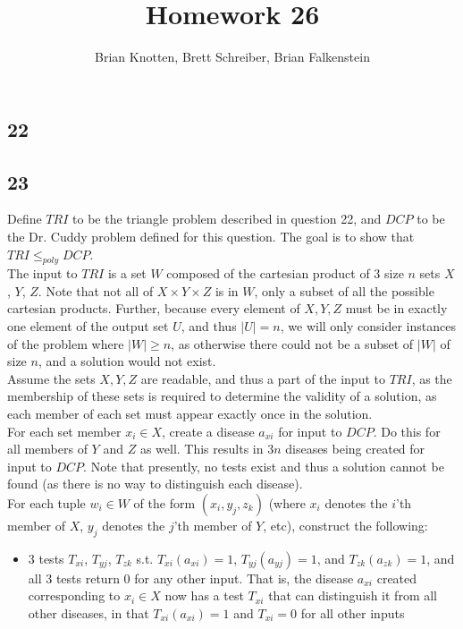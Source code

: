 \documentclass[letterpaper,notitlepage,twoside]{article}
\begin{document}
\title{Homework 26}
\author{Brian Knotten, Brett Schreiber, Brian Falkenstein}
\maketitle
\subsection*{22}


\subsection*{23}
Define $TRI$ to be the triangle problem described in question 22, and $DCP$ to be the Dr. Cuddy problem defined for this question. The goal is to show that $TRI \leq _{poly} DCP$. \\
The input to $TRI$ is a set $W$ composed of the cartesian product of 3 size $n$ sets $X$, $Y$, $Z$. Note that not all of $X \times Y \times Z$ is in $W$, only a subset of all the possible cartesian products. Further, because every element of $X, Y, Z$ must be in exactly one element of the output set $U$, and thus $|U| = n$, we will only consider instances of the problem where $|W| \geq n$, as otherwise there could not be a subset of $|W|$ of size $n$, and a solution would not exist. \\
Assume the sets $X, Y, Z$ are readable, and thus a part of the input to $TRI$, as the membership of these sets is required to determine the validity of a solution, as each member of each set must appear exactly once in the solution. \\
For each set member $x_i\in X$,  create a disease $a_{xi}$ for input to $DCP$. Do this for all members of $Y$ and $Z$ as well. This results in $3n$ diseases being created for input to $DCP$. Note that presently, no tests exist and thus a solution cannot be found (as there is no way to distinguish each disease). \\
For each tuple $w_i \in W$ of the form $(x_i, y_j, z_k)$ (where $x_i$ denotes the $i$'th member of $X$, $y_j$ denotes the $j$'th member of $Y$, etc), construct the following:
\begin{itemize}
\item 3 tests $T_{xi}$, $T_{yj}$, $T_{zk}$ s.t. $T_{xi}(a_{xi}) = 1$,  $T_{yj}(a_{yj}) = 1$, and  $T_{zk}(a_{zk}) = 1$, and all 3 tests return 0 for any other input. That is, the disease $a_{xi}$ created corresponding to $x_i \in X$ now has a test $T_{xi}$ that can distinguish it from all other diseases, in that  $T_{xi}(a_{xi}) = 1$ and $T_{xi} = 0$ for all other inputs 
\end{itemize}
\end{document}
